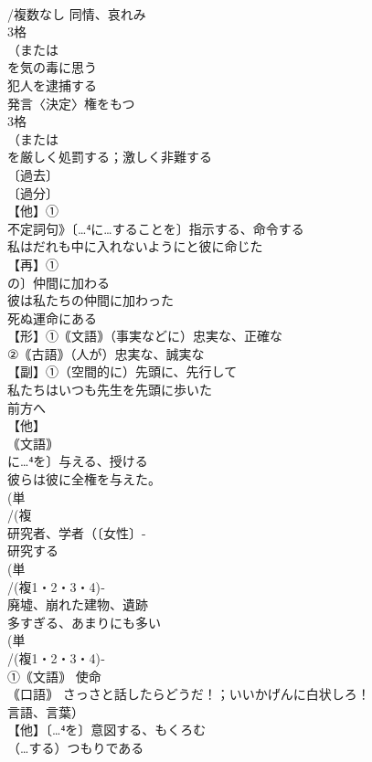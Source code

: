 \documentclass[8pt]{extreport}
\begin{document}
\begin{CJK}{UTF8}{min}
\\	/複数なし 同情、哀れみ 
\\	3格 
\\	（または
\\	を気の毒に思う
\\	犯人を逮捕する
\\	発言〈決定〉権をもつ
\\	3格 
\\	（または
\\	を厳しく処罰する；激しく非難する
\\	〔過去〕
\\	〔過分〕
\\	【他】①
\\	不定詞句》〔…⁴に…することを〕指示する、命令する 
\\	私はだれも中に入れないようにと彼に命じた
\\	【再】①
\\	の〕仲間に加わる 
\\	彼は私たちの仲間に加わった
\\	死ぬ運命にある
\\	【形】①｟文語｠（事実などに）忠実な、正確な 
\\	②｟古語｠（人が）忠実な、誠実な
\\	【副】①（空間的に）先頭に、先行して 
\\	私たちはいつも先生を先頭に歩いた 
\\	前方へ
\\	【他】
\\	｟文語｠
\\	に…⁴を〕与える、授ける 
\\	彼らは彼に全権を与えた。 
\\	(単
\\	/(複
\\	研究者、学者（〔女性〕-
\\	研究する 
\\	(単
\\	/(複1・2・3・4)‐
\\	廃墟、崩れた建物、遺跡 
\\	多すぎる、あまりにも多い
\\	(単
\\	/(複1・2・3・4)‐
\\	①｟文語｠ 使命
\\	｟口語｠ さっさと話したらどうだ！；いいかげんに白状しろ！ 
\\	言語、言葉）
\\	【他】〔…⁴を〕意図する、もくろむ 
\\	（…する）つもりである 

\end{CJK}
\end{document}
